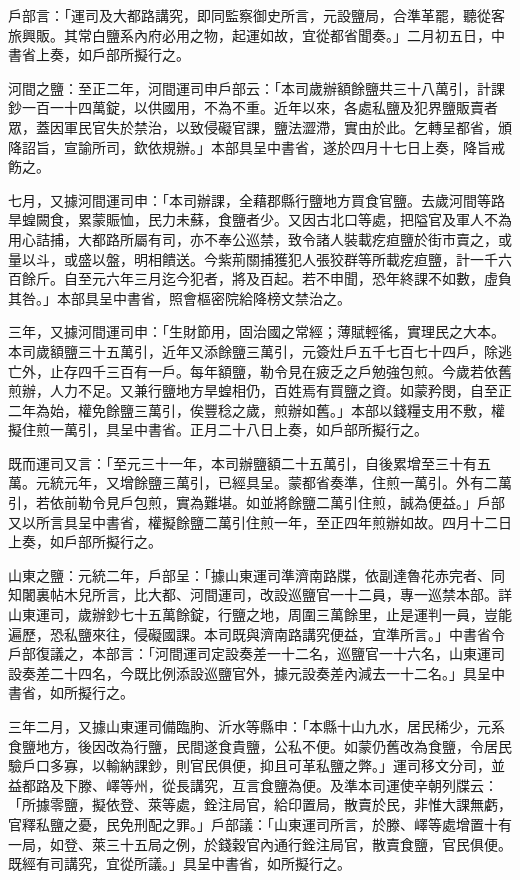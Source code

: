 \begin{pinyinscope}
 戶部言：「運司及大都路講究，即同監察御史所言，元設鹽局，合準革罷，聽從客旅興販。其常白鹽系內府必用之物，起運如故，宜從都省聞奏。」二月初五日，中書省上奏，如戶部所擬行之。



 河間之鹽：至正二年，河間運司申戶部云：「本司歲辦額餘鹽共三十八萬引，計課鈔一百一十四萬錠，以供國用，不為不重。近年以來，各處私鹽及犯界鹽販賣者眾，蓋因軍民官失於禁治，以致侵礙官課，鹽法澀滯，實由於此。乞轉呈都省，頒降詔旨，宣諭所司，欽依規辦。」本部具呈中書省，遂於四月十七日上奏，降旨戒飭之。



 七月，又據河間運司申：「本司辦課，全藉郡縣行鹽地方買食官鹽。去歲河間等路旱蝗闕食，累蒙賑恤，民力未蘇，食鹽者少。又因古北口等處，把隘官及軍人不為用心詰捕，大都路所屬有司，亦不奉公巡禁，致令諸人裝載疙疸鹽於街市賣之，或量以斗，或盛以盤，明相饋送。今紫荊關捕獲犯人張狡群等所載疙疸鹽，計一千六百餘斤。自至元六年三月迄今犯者，將及百起。若不申聞，恐年終課不如數，虛負其咎。」本部具呈中書省，照會樞密院給降榜文禁治之。



 三年，又據河間運司申：「生財節用，固治國之常經；薄賦輕徭，實理民之大本。本司歲額鹽三十五萬引，近年又添餘鹽三萬引，元簽灶戶五千七百七十四戶，除逃亡外，止存四千三百有一戶。每年額鹽，勒令見在疲乏之戶勉強包煎。今歲若依舊煎辦，人力不足。又兼行鹽地方旱蝗相仍，百姓焉有買鹽之資。如蒙矜閔，自至正二年為始，權免餘鹽三萬引，俟豐稔之歲，煎辦如舊。」本部以錢糧支用不敷，權擬住煎一萬引，具呈中書省。正月二十八日上奏，如戶部所擬行之。



 既而運司又言：「至元三十一年，本司辦鹽額二十五萬引，自後累增至三十有五萬。元統元年，又增餘鹽三萬引，已經具呈。蒙都省奏準，住煎一萬引。外有二萬引，若依前勒令見戶包煎，實為難堪。如並將餘鹽二萬引住煎，誠為便益。」戶部又以所言具呈中書省，權擬餘鹽二萬引住煎一年，至正四年煎辦如故。四月十二日上奏，如戶部所擬行之。



 山東之鹽：元統二年，戶部呈：「據山東運司準濟南路牒，依副達魯花赤完者、同知闍裏帖木兒所言，比大都、河間運司，改設巡鹽官一十二員，專一巡禁本部。詳山東運司，歲辦鈔七十五萬餘錠，行鹽之地，周圍三萬餘里，止是運判一員，豈能遍歷，恐私鹽來往，侵礙國課。本司既與濟南路講究便益，宜準所言。」中書省令戶部復議之，本部言：「河間運司定設奏差一十二名，巡鹽官一十六名，山東運司設奏差二十四名，今既比例添設巡鹽官外，據元設奏差內減去一十二名。」具呈中書省，如所擬行之。



 三年二月，又據山東運司備臨朐、沂水等縣申：「本縣十山九水，居民稀少，元系食鹽地方，後因改為行鹽，民間遂食貴鹽，公私不便。如蒙仍舊改為食鹽，令居民驗戶口多寡，以輸納課鈔，則官民俱便，抑且可革私鹽之弊。」運司移文分司，並益都路及下滕、嶧等州，從長講究，互言食鹽為便。及準本司運使辛朝列牒云：「所據零鹽，擬依登、萊等處，銓注局官，給印置局，散賣於民，非惟大課無虧，官釋私鹽之憂，民免刑配之罪。」戶部議：「山東運司所言，於滕、嶧等處增置十有一局，如登、萊三十五局之例，於錢穀官內通行銓注局官，散賣食鹽，官民俱便。既經有司講究，宜從所議。」具呈中書省，如所擬行之。




\end{pinyinscope}
